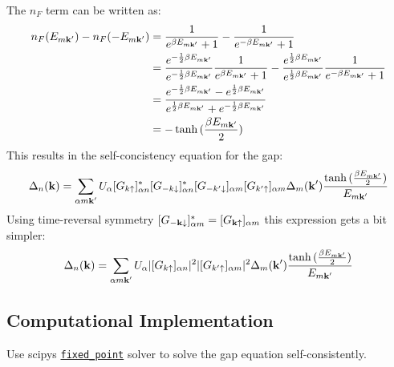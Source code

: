 \documentclass[../main.tex]{subfiles}
\begin{document}
The \(n_F\) term can be written as:
\begin{align}
    n_F(E_{m \bm{\mathrm{k}}^{\prime}}) - n_F(-E_{m \bm{\mathrm{k}}^{\prime}}) &= \frac{1}{e^{\beta E_{m \bm{\mathrm{k}}^{\prime}}} + 1} - \frac{1}{e^{-\beta E_{m \bm{\mathrm{k}}^{\prime}}} + 1} \\
    &= \frac{e^{-\frac{1}{2} \beta E_{m \bm{\mathrm{k}}^{\prime} }}}{e^{-\frac{1}{2} \beta E_{m \bm{\mathrm{k}}^{\prime}}}} \frac{1}{e^{\beta E_{m \bm{\mathrm{k}}^{\prime}}} + 1} - \frac{e^{\frac{1}{2} \beta E_{m \bm{\mathrm{k}}^{\prime}}}}{e^{\frac{1}{2} \beta E_{m \bm{\mathrm{k}}^{\prime}}}} \frac{1}{e^{-\beta E_{m \bm{\mathrm{k}}^{\prime}}} + 1} \\
    &= \frac{e^{-\frac{1}{2} \beta E_{m \bm{\mathrm{k}}^{\prime}}} - e^{\frac{1}{2} \beta E_{m \bm{\mathrm{k}}^{\prime}}}}{e^{\frac{1}{2} \beta E_{m \bm{\mathrm{k}}^{\prime}}} + e^{-\frac{1}{2} \beta E_{m \bm{\mathrm{k}}^{\prime} }}} \\
    &= -\tanh{(\frac{\beta E_{m \bm{\mathrm{k}}^{\prime}}}{2})}
\end{align}
This results in the self-concistency equation for the gap:
\begin{align}
    \Delta_n (\bm{\mathrm{k}}) = \sum_{\alpha m \bm{\mathrm{k}}^{\prime}} U_{\alpha} [G_{k \uparrow}]_{\alpha n}^* [G_{-k \downarrow}]_{\alpha n}^* [G_{-k^{\prime} \downarrow}]_{\alpha m} [G_{k^{\prime} \uparrow}]_{\alpha m} \Delta_{m} (\bm{\mathrm{k}}^{\prime}) \frac{\tanh{(\frac{\beta E_{m \bm{\mathrm{k}}^{\prime}}}{2})}}{E_{m \bm{\mathrm{k}}^{\prime}}}
\end{align}
Using time-reversal symmetry \([G_{-\bm{\mathrm{k}} \downarrow}]_{\alpha m}^* = [G_{\bm{\mathrm{k}} \uparrow}]_{\alpha m}\) this expression gets a bit simpler:
\begin{align}
    \Delta_n (\bm{\mathrm{k}}) = \sum_{\alpha m \bm{\mathrm{k}}^{\prime}} U_{\alpha} \vert[G_{k \uparrow}]_{\alpha n} \vert^2 \vert[G_{k^{\prime} \uparrow}]_{\alpha m} \vert^2 \Delta_{m} (\bm{\mathrm{k}}^{\prime}) \frac{\tanh{(\frac{\beta E_{m \bm{\mathrm{k}}^{\prime}}}{2})}}{E_{m \bm{\mathrm{k}}^{\prime}}}
\end{align}

\subsection{Computational Implementation}

Use scipys \href{https://docs.scipy.org/doc/scipy/reference/generated/scipy.optimize.fixed_point.html}{\texttt{fixed\_point}} solver to solve the gap equation self-consistently.
\end{document}

